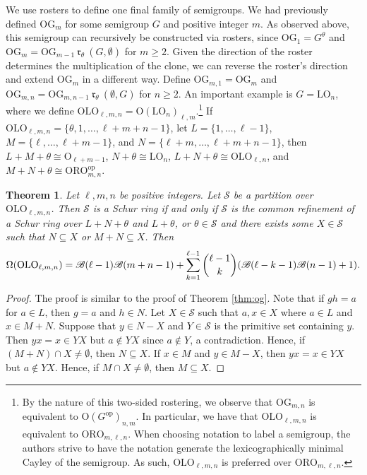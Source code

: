 \documentclass{article}
\theoremstyle{plain}
\newtheorem{Thm}{Theorem}[section]
\theoremstyle{definition}
\renewcommand{\S}{\mathcal{S}}
\newcommand{\B}{\mathscr{B}}
\renewcommand{\O}{\mathrm{O}}
\newcommand{\LO}{\mathrm{LO}}
\newcommand{\ORO}{\mathrm{ORO}}
\newcommand{\OLO}{\mathrm{OLO}}
\newcommand{\OG}{\mathrm{OG}}
\renewcommand{\r}[1]{\ \mathfrak{r}_{#1}\ }
\begin{document}
We use rosters to define one final family of semigroups. We had previously defined $\OG_m$ for some semigroup $G$ and positive integer $m$. As observed above, this semigroup can recursively be constructed via rosters, since $\OG_1 = G^\theta$ and $\OG_m=\OG_{m-1}\r\theta (G,\emptyset)$ for $m\ge 2$. Given the direction of the roster determines the multiplication of the clone, we can reverse the roster's direction and extend $\OG_m$ in a different way. Define \label{ogtwo}$\OG_{m,1} = \OG_m$ and $\OG_{m,n} = \OG_{m,n-1}\r\theta (\emptyset, G)$ for $n\ge 2$. An important example is $G=\LO_n$, where we define $\OLO_{\ell,m,n} = \O(\LO_n)_{\ell,m}$.\label{olothree}\footnote{By the nature of this two-sided rostering, we observe that $\OG_{m,n}$ is equivalent to $\O(G^\text{op})_{n,m}$. In particular, we have that $\OLO_{\ell,m,n}$ is equivalent to \label{orothree}$\ORO_{m,\ell,n}$. When choosing notation to label a semigroup, the authors strive to have the notation generate the lexicographically minimal Cayley of the semigroup. As such, $\OLO_{\ell,m,n}$ is preferred over $\ORO_{m,\ell,n}$.} If $\OLO_{\ell,m,n} = \{\theta,1,\ldots,\ell+m+n-1\}$, let $L = \{1,\ldots,\ell-1\}$, $M=\{\ell,\ldots,\ell+m-1\}$, and $N=\{\ell+m,\ldots, \ell+m+n-1\}$, then $L+M+\theta \cong \O_{\ell+m-1}$, $N+\theta \cong \LO_n$, $L+N+\theta\cong\OLO_{\ell,n}$, and $M+N+\theta\cong \ORO_{m,n}^\text{op}$.

\begin{Thm}\label{thm:orolmn} Let $\ell,m,n$ be positive integers. Let $\S$ be a partition over $\OLO_{\ell,m,n}$. Then $\S$ is a Schur ring if and only if $\S$ is the common refinement of a Schur ring over $L+N+\theta$ and $L+\theta$, or $\theta\in \S$ and there exists some $X\in \S$ such that $N\subseteq X$ or $M+N\subseteq X$. Then \[\Omega(\OLO_{\ell,m,n}) = \B(\ell-1)\B(m+n-1) + \sum_{k=1}^{\ell-1} \dbinom{\ell-1}{k}(\B(\ell-k-1)\B(n-1)+1).\]
\end{Thm}
\begin{proof}
The proof is similar to the proof of Theorem \ref{thm:og}. Note that if $gh=a$ for $a\in L$, then $g=a$ and $h\in N$. Let $X\in \S$ such that $a,x\in X$ where $a\in L$ and $x\in M+N$. Suppose that $y\in N-X$ and $Y\in \S$ is the primitive set containing $y$. Then $yx=x\in YX$ but $a\notin YX$ since $a\notin Y$, a contradiction. Hence, if $(M+N)\cap X\neq \emptyset$, then $N\subseteq X$. If $x\in M$ and $y\in M-X$, then $yx=x\in YX$ but $a\notin YX$. Hence, if $M\cap X\neq\emptyset$, then $M\subseteq X$.      
\end{proof}
\end{document}
